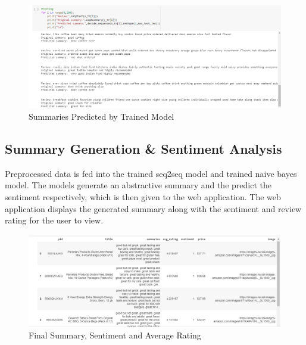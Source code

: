 \documentclass[11pt]{report}
\begin{document}
\begin{figure}[H]
\centering
\includegraphics[scale=0.5]{images/predicted summary.png}
\caption{Summaries Predicted by Trained Model}
\label{fig:train}
\end{figure}

\newpage
\subsection{Summary Generation \& Sentiment Analysis}
Preprocessed data is fed into the trained seq2seq model and trained naive bayes model. The models generate an abstractive summary and the predict the sentiment respectively, which is then given to the web application. The web application displays the generated summary along with the sentiment and review rating for the user to view.
\begin{figure}[H]
\centering
\includegraphics[scale=0.5]{images/SummaryGeneration.png}
\caption{Final Summary, Sentiment and Average Rating}
\label{fig:summaryfinal}
\end{figure}
\end{document}
